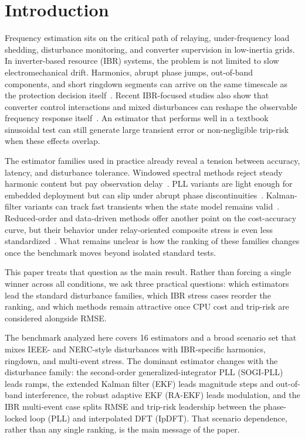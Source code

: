 ﻿\section{Introduction}\label{sec:introduction}

Frequency estimation sits on the critical path of relaying, under-frequency
load shedding, disturbance monitoring, and converter supervision in
low-inertia grids. In inverter-based resource (IBR) systems, the problem is
not limited to slow electromechanical drift. Harmonics, abrupt phase jumps,
out-of-band components, and short ringdown segments can arrive on the same
timescale as the protection decision itself~\cite{Milano2018LowInertia,
Pinheiro2025,Ponce2025}. Recent IBR-focused studies also show that converter
control interactions and mixed disturbances can reshape the observable
frequency response itself~\cite{Bernal2025,Zoghby2024}. An estimator that
performs well in a textbook sinusoidal test can still generate large transient
error or non-negligible trip-risk when these effects overlap.

The estimator families used in practice already reveal a tension between
accuracy, latency, and disturbance tolerance. Windowed spectral methods reject
steady harmonic content but pay observation delay~\cite{Belega2014,
PlatasGarza2011}. PLL variants are light enough for embedded deployment but can
slip under abrupt phase discontinuities~\cite{Golestan2017,Wright2019}.
Kalman-filter variants can track fast transients when the state model remains
valid~\cite{Ferrero2020EKF,Chamorro2021}. Reduced-order and data-driven methods
offer another point on the cost-accuracy curve, but their behavior under
relay-oriented composite stress is even less standardized~\cite{Netto2018KoopmanKF,
Ting2022}. What remains unclear is how the ranking of these families changes once the
benchmark moves beyond isolated standard tests.

This paper treats that question as the main result. Rather than forcing a
single winner across all conditions, we ask three practical questions: which
estimators lead the standard disturbance families, which IBR stress cases
reorder the ranking, and which methods remain attractive once CPU cost and
trip-risk are considered alongside RMSE.

The benchmark analyzed here covers 16 estimators and a broad scenario set
that mixes IEEE- and NERC-style disturbances with IBR-specific harmonics,
ringdown, and multi-event stress. The dominant
estimator changes with the disturbance family: the second-order
generalized-integrator PLL (SOGI-PLL) leads ramps, the extended Kalman filter
(EKF) leads magnitude steps and out-of-band interference, the robust adaptive
EKF (RA-EKF) leads modulation, and the IBR multi-event case splits RMSE and
trip-risk leadership between the phase-locked loop (PLL) and interpolated DFT
(IpDFT). That scenario dependence, rather than any single ranking, is the
main message of the paper.
